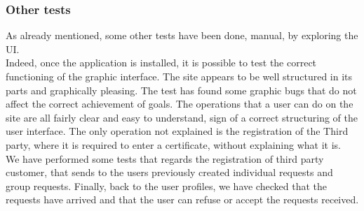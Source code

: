 \subsubsection{Other tests}
As already mentioned, some other tests have been done, manual, by exploring the UI. \\ 
Indeed, once the application is installed, it is possible to test the correct functioning of the graphic interface. 
The site appears to be well structured in its parts and graphically pleasing. 
The test has found some graphic bugs that do not affect the correct achievement of goals. 
The operations that a user can do on the site are all fairly clear and easy to understand, sign of a correct structuring of the user
interface.
The only operation not explained is the registration of the Third party, where it is required to enter a certificate, without explaining what
it is. \\
We have performed some tests that regards the registration of third party customer, that sends to the users previously
created individual requests and group requests. Finally, back to the user profiles, we have checked that the requests have arrived and that
the user can refuse or accept the requests received.
